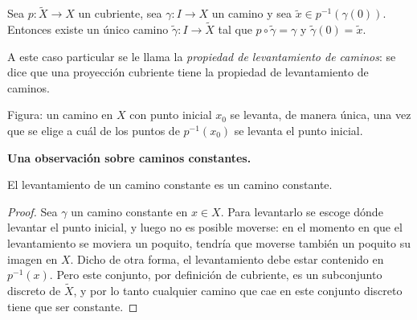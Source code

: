 \documentclass[11pt]{article}
\begin{document}
\begin{cor}\label{cor:levantamiento-caminos}
Sea $p\colon\tilde X\to X$ un cubriente, sea $\gamma\colon I\to X$ un camino y sea $\tilde x\in p^{-1}(\gamma(0))$. Entonces existe un único camino $\tilde\gamma\colon I\to\tilde X$ tal que $p\circ\tilde\gamma=\gamma$ y $\tilde\gamma(0)=\tilde x$.
\end{cor}

A este caso particular se le llama la \emph{propiedad de levantamiento de caminos}: se dice que una proyección cubriente tiene la propiedad de levantamiento de caminos.

\begin{center}
\end{center}

\noindent Figura: un camino en $X$ con punto inicial $x_0$ se levanta, de manera única, una vez que se elige a cuál de los puntos de $p^{-1}(x_0)$ se levanta el punto inicial.

\medskip\noindent\textbf{Una observación sobre caminos constantes.}

\begin{lema}\label{lema:camino-constante}
El levantamiento de un camino constante es un camino constante.
\end{lema}

\begin{proof}
Sea $\gamma$ un camino constante en $x\in X$. Para levantarlo se escoge dónde levantar el punto inicial, y luego no es posible moverse: en el momento en que el levantamiento se moviera un poquito, tendría que moverse también un poquito su imagen en $X$. Dicho de otra forma, el levantamiento debe estar contenido en $p^{-1}(x)$. Pero este conjunto, por definición de cubriente, es un subconjunto discreto de $\tilde X$, y por lo tanto cualquier camino que cae en este conjunto discreto tiene que ser constante.
\end{proof}
\end{document}
